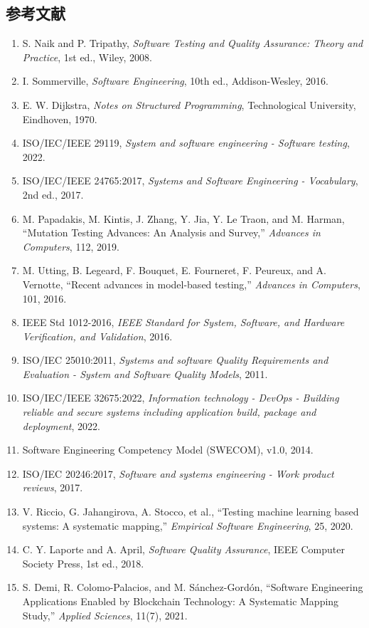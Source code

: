 \subsection{参考文献}
\begin{enumerate}[leftmargin=2.2em]
\item S. Naik and P. Tripathy, \textit{Software Testing and Quality Assurance: Theory and Practice}, 1st ed., Wiley, 2008.
\item I. Sommerville, \textit{Software Engineering}, 10th ed., Addison-Wesley, 2016.
\item E. W. Dijkstra, \textit{Notes on Structured Programming}, Technological University, Eindhoven, 1970.
\item ISO/IEC/IEEE 29119, \textit{System and software engineering - Software testing}, 2022.
\item ISO/IEC/IEEE 24765:2017, \textit{Systems and Software Engineering - Vocabulary}, 2nd ed., 2017.
\item M. Papadakis, M. Kintis, J. Zhang, Y. Jia, Y. Le Traon, and M. Harman, ``Mutation Testing Advances: An Analysis and Survey,'' \textit{Advances in Computers}, 112, 2019.
\item M. Utting, B. Legeard, F. Bouquet, E. Fourneret, F. Peureux, and A. Vernotte, ``Recent advances in model-based testing,'' \textit{Advances in Computers}, 101, 2016.
\item IEEE Std 1012-2016, \textit{IEEE Standard for System, Software, and Hardware Verification, and Validation}, 2016.
\item ISO/IEC 25010:2011, \textit{Systems and software Quality Requirements and Evaluation - System and Software Quality Models}, 2011.
\item ISO/IEC/IEEE 32675:2022, \textit{Information technology - DevOps - Building reliable and secure systems including application build, package and deployment}, 2022.
\item Software Engineering Competency Model (SWECOM), v1.0, 2014.
\item ISO/IEC 20246:2017, \textit{Software and systems engineering - Work product reviews}, 2017.
\item V. Riccio, G. Jahangirova, A. Stocco, et al., ``Testing machine learning based systems: A systematic mapping,'' \textit{Empirical Software Engineering}, 25, 2020.
\item C. Y. Laporte and A. April, \textit{Software Quality Assurance}, IEEE Computer Society Press, 1st ed., 2018.
\item S. Demi, R. Colomo-Palacios, and M. Sánchez-Gordón, ``Software Engineering Applications Enabled by Blockchain Technology: A Systematic Mapping Study,'' \textit{Applied Sciences}, 11(7), 2021.

\end{enumerate}
